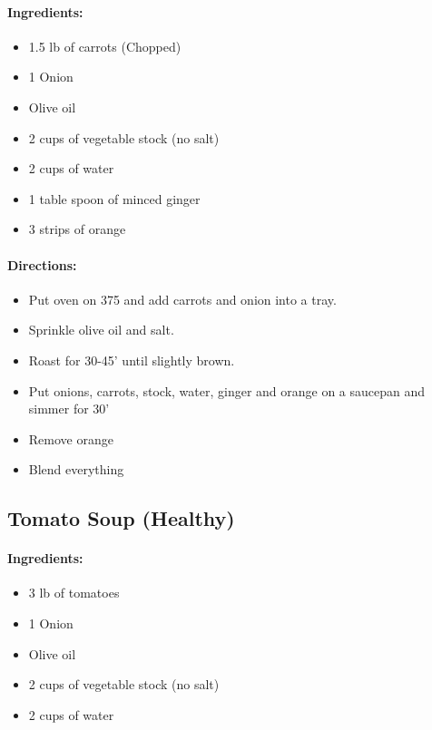 \documentclass{article}
\begin{document}
\paragraph{Ingredients:}
\begin{itemize}
    \item 1.5 lb of carrots (Chopped)
    \item 1 Onion
    \item Olive oil
    \item 2 cups of vegetable stock (no salt)
    \item 2 cups of water
    \item 1 table spoon of minced ginger
    \item 3 strips of orange
\end{itemize}

\paragraph{Directions:}
\begin{itemize}
    \item Put oven on 375 and add carrots and onion into a tray.
    \item Sprinkle olive oil and salt.
    \item Roast for 30-45' until slightly brown.
    \item Put onions, carrots, stock, water, ginger and orange on a saucepan and simmer for 30'
    \item Remove orange
    \item Blend everything
\end{itemize}

\subsection{Tomato Soup (Healthy)}

\paragraph{Ingredients:}
\begin{itemize}
    \item 3 lb of tomatoes
    \item 1 Onion
    \item Olive oil
    \item 2 cups of vegetable stock (no salt)
    \item 2 cups of water
\end{itemize}
\end{document}
